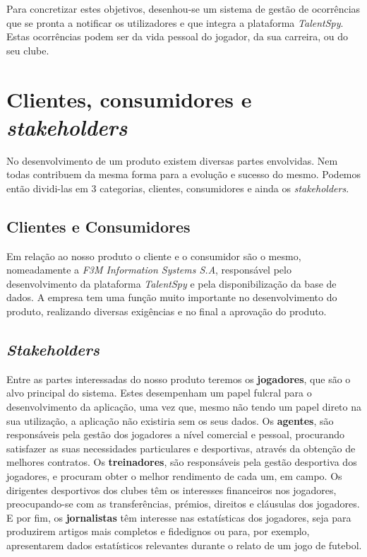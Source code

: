 Para concretizar estes objetivos, desenhou-se um sistema de gestão de ocorrências que se pronta a notificar os utilizadores e que integra a plataforma \emph{TalentSpy}. Estas ocorrências podem ser da vida pessoal do jogador, da sua carreira, ou do seu clube.

\section{Clientes, consumidores e \emph{stakeholders}}

No desenvolvimento de um produto existem diversas partes envolvidas. Nem todas contribuem da mesma forma para a evolução e sucesso do mesmo. Podemos então dividi-las em 3 categorias, clientes, consumidores e ainda os \emph{stakeholders}.

\subsection{Clientes e Consumidores}
Em relação ao nosso produto o cliente e o consumidor são o mesmo, nomeadamente a \emph{F3M Information Systems S.A}, responsável pelo desenvolvimento da plataforma \emph{TalentSpy} e pela disponibilização da base de dados. A empresa tem uma função muito importante no desenvolvimento do produto, realizando diversas exigências e no final a aprovação do produto.
\subsection{\emph{Stakeholders}}
Entre as partes interessadas do nosso produto teremos os \textbf{jogadores}, que são o alvo principal do sistema. Estes desempenham um papel fulcral para o desenvolvimento da aplicação, uma vez que, mesmo não tendo um papel direto na sua utilização, a aplicação não existiria sem os seus dados.
Os \textbf{agentes}, são responsáveis pela gestão dos jogadores a nível comercial e pessoal, procurando satisfazer as suas necessidades particulares e desportivas, através da obtenção de melhores contratos.
Os \textbf{treinadores}, são responsáveis pela gestão desportiva dos jogadores, e procuram obter o melhor rendimento de cada um, em campo.
Os dirigentes desportivos dos clubes têm os interesses financeiros nos jogadores, preocupando-se com as transferências, prémios, direitos e cláusulas dos jogadores.
E por fim, os \textbf{jornalistas} têm interesse nas estatísticas dos jogadores, seja para produzirem artigos mais completos e fidedignos ou para, por exemplo, apresentarem dados estatísticos relevantes durante o relato de um jogo de futebol.

